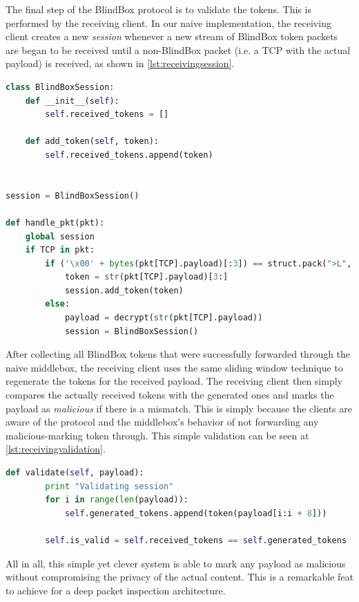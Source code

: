 \documentclass{winslabreport}
\begin{document}
The final step of the BlindBox protocol is to validate the tokens. This is performed by the receiving client. In our naive implementation, the receiving client creates a new \emph{session} whenever a new stream of BlindBox token packets are began to be received until a non-BlindBox packet (i.e. a TCP with the actual payload) is received, as shown in \autoref{lst:receivingsession}. 

\begin{lstlisting}[caption={Receiving Tokens},label={lst:receivingsession},language=Python]
class BlindBoxSession:
    def __init__(self):
        self.received_tokens = []

    def add_token(self, token):
        self.received_tokens.append(token)


session = BlindBoxSession()

def handle_pkt(pkt):
    global session
    if TCP in pkt:
        if ('\x00' + bytes(pkt[TCP].payload)[:3]) == struct.pack(">L", TYPE_BLINDBOX):
            token = str(pkt[TCP].payload)[3:]
            session.add_token(token)
        else:
            payload = decrypt(str(pkt[TCP].payload))
            session = BlindBoxSession()
\end{lstlisting}

After collecting all BlindBox tokens that were successfully forwarded through the naive middlebox, the receiving client uses the same sliding window technique to regenerate the tokens for the received payload. The receiving client then simply compares the actually received tokens with the generated ones and marks the payload as \emph{malicious} if there is a mismatch. This is simply because the clients are aware of the protocol and the middlebox's behavior of not forwarding any malicious-marking token through. This simple validation can be seen at \autoref{lst:receivingvalidation}.

\begin{lstlisting}[caption={Validating Tokens},label={lst:receivingvalidation},language=Python]
    def validate(self, payload):
        print "Validating session"
        for i in range(len(payload)):
            self.generated_tokens.append(token(payload[i:i + 8]))

        self.is_valid = self.received_tokens == self.generated_tokens
\end{lstlisting}

All in all, this simple yet clever system is able to mark any payload as malicious without compromising the privacy of the actual content. This is a remarkable feat to achieve for a deep packet inspection architecture.
\end{document}

